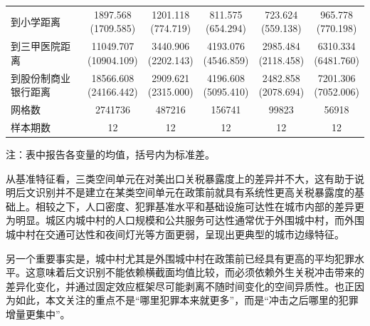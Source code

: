 \documentclass[a4paper,12pt]{report}
\begin{document}
\begin{table}[H]
\begin{adjustbox}{width=\textwidth,center}
\begin{tabular}{lccccc}
到小学距离 & \makecell{1897.568\\(1709.585)} & \makecell{1201.118\\(774.719)} & \makecell{811.575\\(654.294)} & \makecell{723.624\\(559.138)} & \makecell{965.778\\(770.198)} \\
到三甲医院距离 & \makecell{11049.707\\(10904.109)} & \makecell{3440.906\\(2202.143)} & \makecell{4193.076\\(4546.859)} & \makecell{2985.484\\(2118.458)} & \makecell{6310.334\\(6481.760)} \\
到股份制商业银行距离 & \makecell{18566.608\\(24166.442)} & \makecell{2909.621\\(2315.000)} & \makecell{4196.608\\(5095.410)} & \makecell{2482.858\\(2078.694)} & \makecell{7201.306\\(7052.006)} \\
网格数 & 2741736 & 487216 & 156741 & 99823 & 56918 \\
样本期数 & 12 & 12 & 12 & 12 & 12 \\
\bottomrule
\end{tabular}
\end{adjustbox}
\vspace{0.2cm}

\par\raggedright{} 注：表中报告各变量的均值，括号内为标准差。
\end{table}

从基准特征看，三类空间单元在对美出口关税暴露度上的差异并不大，这有助于说明后文识别并不是建立在某类空间单元在政策前就具有系统性更高关税暴露度的基础上。相较之下，人口密度、犯罪基准水平和基础设施可达性在城市内部的差异更为明显。城区内城中村的人口规模和公共服务可达性通常优于外围城中村，而外围城中村在交通可达性和夜间灯光等方面更弱，呈现出更典型的城市边缘特征。

另一个重要事实是，城中村尤其是外围城中村在政策前已经具有更高的平均犯罪水平。这意味着后文识别不能依赖横截面均值比较，而必须依赖外生关税冲击带来的差异化变化，并通过固定效应框架尽可能剥离不随时间变化的空间异质性。也正因为如此，本文关注的重点不是“哪里犯罪本来就更多”，而是“冲击之后哪里的犯罪增量更集中”。
\end{document}
